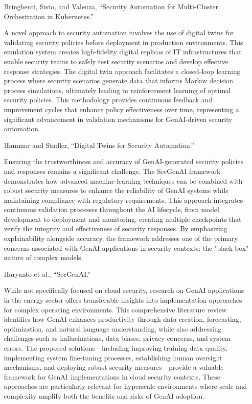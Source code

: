 Bringhenti, Sisto, and Valenza, “Security Automation for Multi-Cluster Orchestration in Kubernetes.”

A novel approach to security automation involves the use of digital twins for validating security policies before deployment in production environments. This emulation system creates high-fidelity digital replicas of IT infrastructures that enable security teams to safely test security scenarios and develop effective response strategies.
The digital twin approach facilitates a closed-loop learning process where security scenarios generate data that informs Markov decision process simulations, ultimately leading to reinforcement learning of optimal security policies. This methodology provides continuous feedback and improvement cycles that enhance policy effectiveness over time, representing a significant advancement in validation mechanisms for GenAI-driven security automation.

Hammar and Stadler, “Digital Twins for Security Automation.”

Ensuring the trustworthiness and accuracy of GenAI-generated security policies and responses remains a significant challenge. The SecGenAI framework demonstrates how advanced machine learning techniques can be combined with robust security measures to enhance the reliability of GenAI systems while maintaining compliance with regulatory requirements.
This approach integrates continuous validation processes throughout the AI lifecycle, from model development to deployment and monitoring, creating multiple checkpoints that verify the integrity and effectiveness of security responses. By emphasizing explainability alongside accuracy, the framework addresses one of the primary concerns associated with GenAI applications in security contexts: the "black box" nature of complex models.

Haryanto et al., “SecGenAI.”

While not specifically focused on cloud security, research on GenAI applications in the energy sector offers transferable insights into implementation approaches for complex operating environments. This comprehensive literature review identifies how GenAI enhances productivity through data creation, forecasting, optimization, and natural language understanding, while also addressing challenges such as hallucinations, data biases, privacy concerns, and system errors.
The proposed solutions—including improving training data quality, implementing system fine-tuning processes, establishing human oversight mechanisms, and deploying robust security measures—provide a valuable framework for GenAI implementations in cloud security contexts. These approaches are particularly relevant for hyperscale environments where scale and complexity amplify both the benefits and risks of GenAI adoption.

